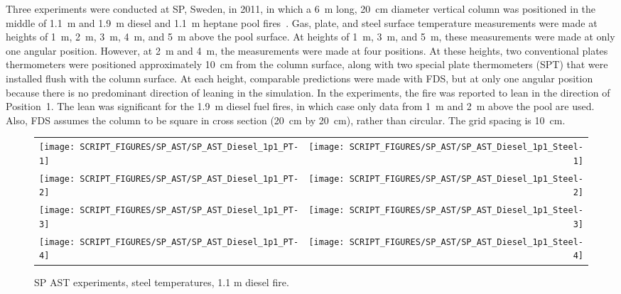 Three experiments were conducted at SP, Sweden, in 2011, in which a 6~m long, 20~cm diameter vertical column was positioned in the middle of 1.1~m and 1.9~m diesel and 1.1~m heptane pool fires~\cite{Sjostrom:AST}. Gas, plate, and steel surface temperature measurements were made at heights of 1~m, 2~m, 3~m, 4~m, and 5~m above the pool surface. At heights of 1~m, 3~m, and 5~m, these measurements were made at only one angular position. However, at 2~m and 4~m, the measurements were made at four positions. At these heights, two conventional plates thermometers were positioned approximately 10~cm from the column surface, along with two special plate thermometers (SPT) that were installed flush with the column surface. At each height, comparable predictions were made with FDS, but at only one angular position because there is no predominant direction of leaning in the simulation. In the experiments, the fire was reported to lean in the direction of Position~1. The lean was significant for the 1.9~m diesel fuel fires, in which case only data from 1~m and 2~m above the pool are used. Also, FDS assumes the column to be square in cross section (20~cm by 20~cm), rather than circular. The grid spacing is 10~cm.

\newpage

\begin{figure}[p]
\begin{tabular*}{\textwidth}{l@{\extracolsep{\fill}}r}
\texttt{[image: SCRIPT\_FIGURES/SP\_AST/SP\_AST\_Diesel\_1p1\_PT-1]}  &  \texttt{[image: SCRIPT\_FIGURES/SP\_AST/SP\_AST\_Diesel\_1p1\_Steel-1]}    \\
\texttt{[image: SCRIPT\_FIGURES/SP\_AST/SP\_AST\_Diesel\_1p1\_PT-2]}  &  \texttt{[image: SCRIPT\_FIGURES/SP\_AST/SP\_AST\_Diesel\_1p1\_Steel-2]}    \\
\texttt{[image: SCRIPT\_FIGURES/SP\_AST/SP\_AST\_Diesel\_1p1\_PT-3]}  &  \texttt{[image: SCRIPT\_FIGURES/SP\_AST/SP\_AST\_Diesel\_1p1\_Steel-3]}    \\
\texttt{[image: SCRIPT\_FIGURES/SP\_AST/SP\_AST\_Diesel\_1p1\_PT-4]}  &  \texttt{[image: SCRIPT\_FIGURES/SP\_AST/SP\_AST\_Diesel\_1p1\_Steel-4]}
\end{tabular*}
\caption[SP AST experiments, steel temperatures, 1.1 m diesel fire]{SP AST experiments, steel temperatures, 1.1 m diesel fire.}
\label{SP_Diesel_1p1_PT_Steel}
\end{figure}

